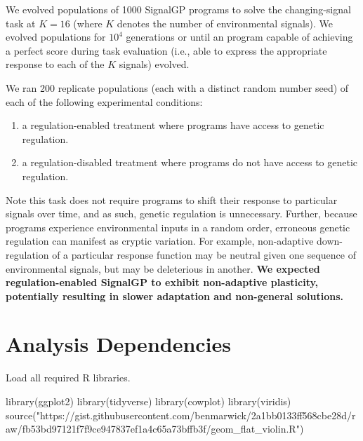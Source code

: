 \documentclass[
]{book}
\newenvironment{Shaded}{\begin{snugshade}}{\end{snugshade}}
\newcommand{\FunctionTok}[1]{\textcolor[rgb]{0.00,0.00,0.00}{#1}}
\newcommand{\NormalTok}[1]{#1}
\newcommand{\StringTok}[1]{\textcolor[rgb]{0.31,0.60,0.02}{#1}}
\providecommand{\tightlist}{%
  \setlength{\itemsep}{0pt}\setlength{\parskip}{0pt}}
\begin{document}
We evolved populations of 1000 SignalGP programs to solve the changing-signal task at \(K=16\) (where \(K\) denotes the number of environmental signals).
We evolved populations for \ensuremath{10^{4}} generations or until an program capable of achieving a perfect score during task evaluation (i.e., able to express the appropriate response to each of the \(K\) signals) evolved.

We ran 200 replicate populations (each with a distinct random number seed) of each of the following experimental conditions:

\begin{enumerate}
\def\labelenumi{\arabic{enumi}.}
\tightlist
\item
  a regulation-enabled treatment where programs have access to genetic regulation.
\item
  a regulation-disabled treatment where programs do not have access to genetic regulation.
\end{enumerate}

Note this task does not require programs to shift their response to particular signals over time, and as such, genetic regulation is unnecessary.
Further, because programs experience environmental inputs in a random order, erroneous genetic regulation can manifest as cryptic variation.
For example, non-adaptive down-regulation of a particular response function may be neutral given one sequence of environmental signals, but may be deleterious in another.
\textbf{We expected regulation-enabled SignalGP to exhibit non-adaptive plasticity, potentially resulting in slower adaptation and non-general solutions.}

\hypertarget{analysis-dependencies-4}{%
\section{Analysis Dependencies}\label{analysis-dependencies-4}}

Load all required R libraries.

\begin{Shaded}
\begin{Highlighting}[]
\FunctionTok{library}\NormalTok{(ggplot2)}
\FunctionTok{library}\NormalTok{(tidyverse)}
\FunctionTok{library}\NormalTok{(cowplot)}
\FunctionTok{library}\NormalTok{(viridis)}
\FunctionTok{source}\NormalTok{(}\StringTok{"https://gist.githubusercontent.com/benmarwick/2a1bb0133ff568cbe28d/raw/fb53bd97121f7f9ce947837ef1a4c65a73bffb3f/geom\_flat\_violin.R"}\NormalTok{)}
\end{Highlighting}
\end{Shaded}
\end{document}
